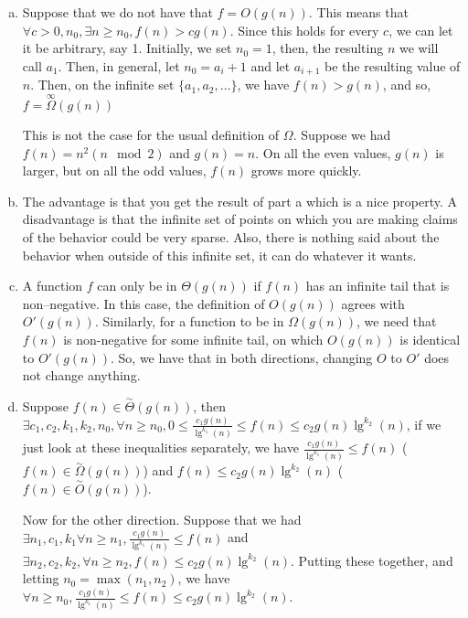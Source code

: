 \documentclass{article}
\begin{document}
\begin{enumerate}[a.]
\item
Suppose that we do not have that $f=O(g(n))$. This means that $\forall c>0,n_0, \exists n\ge n_0, f(n) > c g(n)$. Since this holds for every $c$, we can let it be arbitrary, say 1. Initially, we set $n_0=1$, then, the resulting $n$ we will call $a_1$. Then, in general, let $n_0= a_i+1$ and let $a_{i+1}$ be the resulting value of $n$. Then, on the infinite set $\{a_1,a_2,\ldots\}$, we have $f(n)>g(n)$, and so, $f = \overset{\infty}{\Omega}(g(n))$

This is not the case for the usual definition of $\Omega$. Suppose we had $f(n) = n^2(n\mod 2)$ and $g(n) = n$. On all the even values, $g(n)$ is larger, but on all the odd values, $f(n)$ grows more quickly.

\item
The advantage is that you get the result of part a which is a nice property. A disadvantage is that the infinite set of points on which you are making claims of the behavior could  be very sparse. Also, there is nothing said about the behavior when outside of this infinite set, it can do whatever it wants.

\item
A function $f$ can only be in $\Theta(g(n))$ if $f(n)$ has an infinite tail that is non--negative. In this case, the definition of $O(g(n))$ agrees with $O'(g(n))$. Similarly, for a function to be in $\Omega(g(n))$, we need that $f(n)$ is non-negative for some infinite tail, on which $O(g(n))$ is identical to $O'(g(n))$. So, we have that in both directions, changing $O$ to $O'$ does not change anything.

\item
Suppose $f(n)\in \overset{\sim}{\Theta}(g(n))$, then $\exists c_1,c_2,k_1,k_2,n_0, \forall n\ge n_0, 0\le \frac{c_1 g(n)}{\lg^{k_1}(n)} \le f(n) \le c_2 g(n)\lg^{k_2}(n)$, if we just look at these inequalities separately, we have $\frac{c_1 g(n)}{\lg^{k_1}(n)} \le f(n)$ ($f(n) \in \overset{\sim}{\Omega}(g(n))$) and $f(n) \le c_2 g(n)\lg^{k_2}(n)$ ($f(n)\in \overset{\sim}{O}(g(n))$).

Now for the other direction. Suppose that we had $\exists n_1, c_1,k_1 \forall n\ge n_1, \frac{c_1 g(n)}{\lg^{k_1}(n)} \le f(n)$ and $\exists n_2,c_2,k_2, \forall n\ge n_2, f(n)\le c_2g(n)\lg^{k_2}(n)$. Putting these together, and letting $n_0 = \max(n_1,n_2)$, we have $\forall n\ge n_0, \frac{c_1 g(n)}{\lg^{k_1}(n)} \le f(n) \le c_2 g(n)\lg^{k_2}(n)$. 

\end{enumerate}
\end{document}
